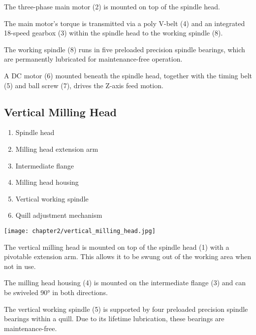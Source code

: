 The three-phase main motor (2) is mounted on top of the spindle head.

The main motor's torque is transmitted via a poly V-belt (4) and an integrated 18-speed gearbox (3) within the spindle head to the working spindle (8).

The working spindle (8) runs in five preloaded precision spindle bearings, which are permanently lubricated for maintenance-free operation.

A DC motor (6) mounted beneath the spindle head, together with the timing belt (5) and ball screw (7), drives the Z-axis feed motion.

\vfill
\clearpage

\subsection{Vertical Milling Head}

\begin{minipage}{0.5\textwidth}
    \begin{enumerate}[itemsep=1pt,parsep=0pt]
        \item Spindle head
        \item Milling head extension arm
        \item Intermediate flange
        \item Milling head housing
        \item Vertical working spindle
        \item Quill adjustment mechanism
    \end{enumerate}
\end{minipage}%
\begin{minipage}{0.5\textwidth}
    \centering
    \texttt{[image: chapter2/vertical\_milling\_head.jpg]}
    \label{fig:vertical_milling_head}
\end{minipage}

\vspace{1cm}

The vertical milling head is mounted on top of the spindle head (1) with a pivotable extension arm. This allows it to be swung out of the working area when not in use.

The milling head housing (4) is mounted on the intermediate flange (3) and can be swiveled 90° in both directions.

The vertical working spindle (5) is supported by four preloaded precision spindle bearings within a quill. Due to its lifetime lubrication, these bearings are maintenance-free.

